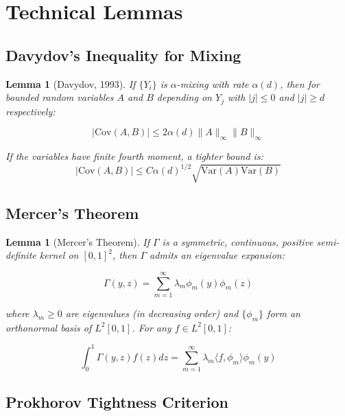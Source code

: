\documentclass[12pt]{article}
\theoremstyle{plain}
\newtheorem{lemma}[theorem]{Lemma}
\theoremstyle{definition}
\newcommand{\abs}[1]{\left\lvert #1 \right\rvert}
\newcommand{\Var}[1]{\mathrm{Var}(#1)}
\newcommand{\Cov}[1]{\mathrm{Cov}(#1)}
\newcommand{\1}[1]{\mathbf{1}_{#1}}
\begin{document}
\section{Technical Lemmas}

\subsection{Davydov's Inequality for Mixing}

\begin{lemma}[Davydov, 1993]
If $\{Y_i\}$ is $\alpha$-mixing with rate $\alpha(d)$, then for bounded random variables $A$ and $B$ depending on $Y_j$ with $|j| \le 0$ and $|j| \ge d$ respectively:

\begin{equation}
\abs{\Cov{A,B}} \le 2\alpha(d) \|A\|_\infty \|B\|_\infty
\end{equation}

If the variables have finite fourth moment, a tighter bound is:
\begin{equation}
\abs{\Cov{A,B}} \le C\alpha(d)^{1/2} \sqrt{\Var{A}\Var{B}}
\end{equation}
\end{lemma}

\subsection{Mercer's Theorem}

\begin{lemma}[Mercer's Theorem]
If $\Gamma$ is a symmetric, continuous, positive semi-definite kernel on $[0,1]^2$, then $\Gamma$ admits an eigenvalue expansion:

\begin{equation}
\Gamma(y,z) = \sum_{m=1}^\infty \lambda_m \phi_m(y) \phi_m(z)
\end{equation}

where $\lambda_m \ge 0$ are eigenvalues (in decreasing order) and $\{\phi_m\}$ form an orthonormal basis of $L^2[0,1]$. For any $f \in L^2[0,1]$:

\begin{equation}
\int_0^1 \Gamma(y,z) f(z) dz = \sum_{m=1}^\infty \lambda_m \langle f, \phi_m \rangle \phi_m(y)
\end{equation}
\end{lemma}

\subsection{Prokhorov Tightness Criterion}
\end{document}
